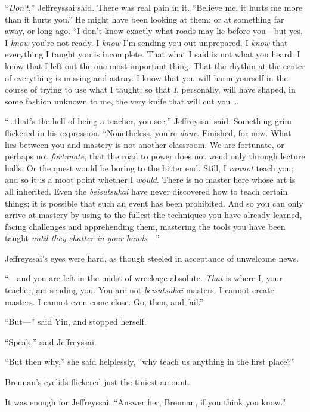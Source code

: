 {
 ``\textit{Don't},''
Jeffreyssai said. There was real pain in it. ``Believe
me, it hurts me more than it hurts you.'' He might
have been looking at them; or at something far away, or long ago.
``I don't know exactly what roads may
lie before you---but yes, I \textit{know} you're not
ready. I \textit{know} I'm sending you out unprepared.
I \textit{know} that everything I taught you is incomplete. That what I
said is not what you heard. I know that I left out the one most
important thing. That the rhythm at the center of everything is missing
and astray. I know that you will harm yourself in the course of trying
to use what I taught; so that \textit{I}, personally, will have shaped,
in some fashion unknown to me, the very knife that will cut you \ldots}

{
 ``\ldots that's the hell of being
a teacher, you see,'' Jeffreyssai said. Something
grim flickered in his expression. ``Nonetheless,
you're \textit{done}. Finished, for now. What lies
between you and mastery is not another classroom. We are fortunate, or
perhaps not \textit{fortunate}, that the road to power does not wend
only through lecture halls. Or the quest would be boring to the bitter
end. Still, I \textit{cannot} teach you; and so it is a moot point
whether I \textit{would}. There is no master here whose art is all
inherited. Even the \textit{beisutsukai} have never discovered how to
teach certain things; it is possible that such an event has been
prohibited. And so you can only arrive at mastery by using to the
fullest the techniques you have already learned, facing challenges and
apprehending them, mastering the tools you have been taught
\textit{until they shatter in your hands}{}---''}

{
 Jeffreyssai's eyes were hard, as though steeled in
acceptance of unwelcome news.}

{
 ``---and you are left in the midst of wreckage
absolute. \textit{That} is where I, your teacher, am sending you. You
are not \textit{beisutsukai} masters. I cannot create masters. I cannot
even come close. Go, then, and fail.''}

{
 ``But---'' said Yin, and
stopped herself.}

{
 ``Speak,'' said Jeffreyssai.}

{
 ``But then why,'' she said
helplessly, ``why teach us anything in the first
place?''}

{
 Brennan's eyelids flickered just the tiniest
amount.}

{
 It was enough for Jeffreyssai. ``Answer her,
Brennan, if you think you know.''}

